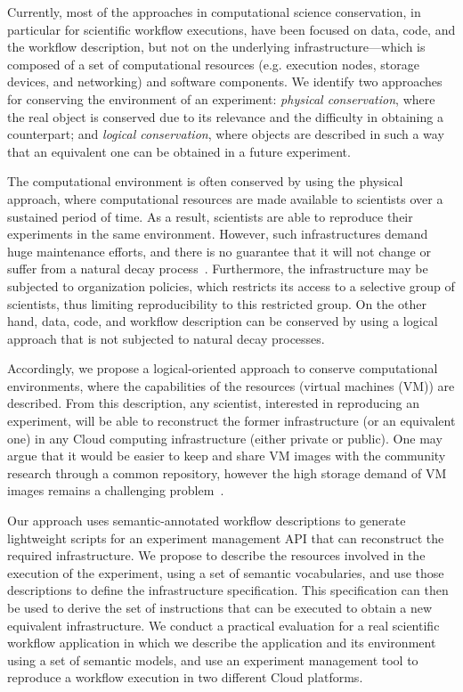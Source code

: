 Currently, most of the approaches in computational science conservation, in particular for scientific workflow executions, have been focused on data, code, and the workflow description, but not on the underlying infrastructure---which is composed of a set of computational resources (e.g. execution nodes, storage devices, and networking) and software components. We identify two approaches for conserving the environment of an experiment: \emph{physical conservation}, where the real object is conserved due to its relevance and the difficulty in obtaining a counterpart; and \emph{logical conservation}, where objects are described in such a way that an equivalent one can be obtained in a future experiment.

The computational environment is often conserved by using the physical approach, where computational resources are made available to scientists over a sustained period of time. As a result, scientists are able to reproduce their experiments in the same environment. However, such infrastructures demand huge maintenance efforts, and there is no guarantee that it will not change or suffer from a natural decay process~\cite{Gavish2011637}. Furthermore, the infrastructure may be subjected to organization policies, which restricts its access to a selective group of scientists, thus limiting reproducibility to this restricted group. On the other hand, data, code, and workflow description can be conserved by using a logical approach that is not subjected to natural decay processes. 

Accordingly, we propose a logical-oriented approach to conserve computational environments, where the capabilities of the resources (virtual machines (VM)) are described. From this description, any scientist, interested in reproducing an experiment, will be able to reconstruct the former infrastructure (or an equivalent one) in any Cloud computing infrastructure (either private or public). One may argue that it would be easier to keep and share VM images with the community research through a common repository, however the high storage demand of VM images remains a challenging problem~\cite{Mao:2014:ROD:2600090.2512348,6552826}. 

Our approach uses semantic-annotated workflow descriptions to generate lightweight scripts for an experiment management API that can reconstruct the required infrastructure. We propose to describe the resources involved in the execution of the experiment, using a set of semantic vocabularies, and use those descriptions to define the infrastructure specification. This specification can then be used to derive the set of instructions that can be executed to obtain a new equivalent infrastructure. We conduct a practical evaluation for a real scientific workflow application in which we describe the application and its environment using a set of semantic models, and use an experiment management tool to reproduce a workflow execution in two different Cloud platforms. 

